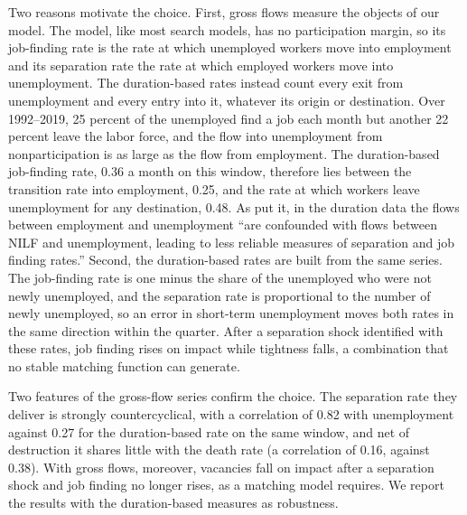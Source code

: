 \documentclass[authoryear, review, 12pt]{elsarticle}
\begin{document}
Two reasons motivate the choice. First, gross flows measure the objects of our model. The model, like most search models, has no participation margin, so its job-finding rate is the rate at which unemployed workers move into employment and its separation rate the rate at which employed workers move into unemployment. The duration-based rates instead count every exit from unemployment and every entry into it, whatever its origin or destination. Over 1992--2019, 25 percent of the unemployed find a job each month but another 22 percent leave the labor force, and the flow into unemployment from nonparticipation is as large as the flow from employment. The duration-based job-finding rate, 0.36 a month on this window, therefore lies between the transition rate into employment, 0.25, and the rate at which workers leave unemployment for any destination, 0.48. As \citet{fujita_2009} put it, in the duration data the flows between employment and unemployment ``are confounded with flows between NILF and unemployment, leading to less reliable measures of separation and job finding rates.'' Second, the duration-based rates are built from the same series. The job-finding rate is one minus the share of the unemployed who were not newly unemployed, and the separation rate is proportional to the number of newly unemployed, so an error in short-term unemployment moves both rates in the same direction within the quarter. After a separation shock identified with these rates, job finding rises on impact while tightness falls, a combination that no stable matching function can generate.

Two features of the gross-flow series confirm the choice. The separation rate they deliver is strongly countercyclical, with a correlation of 0.82 with unemployment against 0.27 for the duration-based rate on the same window, and net of destruction it shares little with the death rate (a correlation of 0.16, against 0.38). With gross flows, moreover, vacancies fall on impact after a separation shock and job finding no longer rises, as a matching model requires. We report the results with the duration-based measures as robustness.
\end{document}
